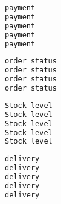 \documentclass[12pt,letter]{article}
\begin{document}
\begin{lstlisting}[language=Python, caption=Payment Transaction]
payment
payment
payment
payment
payment
\end{lstlisting}


\begin{lstlisting}[language=Python, caption=OrderStatus Transaction]
order status
order status
order status
order status
\end{lstlisting}


\begin{lstlisting}[language=Python, caption=StockLevel Transaction]
Stock level
Stock level
Stock level
Stock level
Stock level
\end{lstlisting}


\begin{lstlisting}[language=Python, caption=Delivery Transaction]
delivery
delivery
delivery
delivery
delivery
\end{lstlisting}









\end{document}
